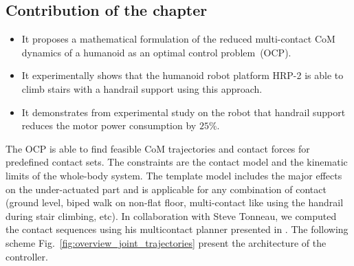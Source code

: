 \subsection*{Contribution of the chapter}

\begin{itemize}
\item It proposes a mathematical formulation of the reduced multi-contact CoM dynamics of a humanoid as an optimal control problem~(OCP).
\item It experimentally shows that the humanoid robot platform \mbox{HRP-2} is able to climb stairs with a handrail support using this approach.
\item It demonstrates from experimental study on the robot that handrail support reduces the motor power consumption by $25\%$.
\end{itemize}

The OCP is able to find feasible CoM trajectories and contact forces for predefined contact sets.
The constraints are the contact model and the kinematic limits of the whole-body system.
The template model includes the major effects on the under-actuated part and is applicable for any combination of contact (ground level, biped walk on non-flat floor, multi-contact like using the handrail during stair climbing, etc).
In collaboration with Steve Tonneau, we computed the contact sequences using his multicontact planner presented in \cite{tonneau_isrr15}.
The following scheme Fig.~\ref{fig:overview_joint_trajectories} present the architecture of the controller.

